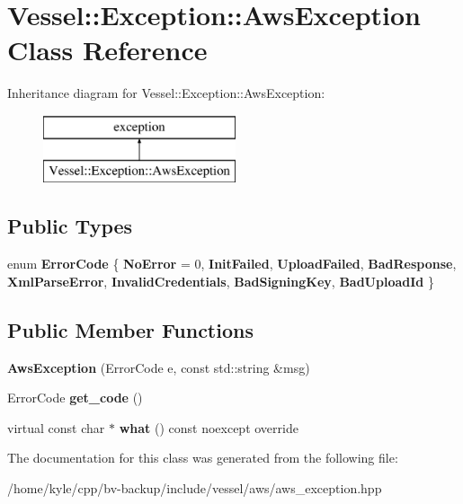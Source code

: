 \hypertarget{class_vessel_1_1_exception_1_1_aws_exception}{}\section{Vessel\+:\+:Exception\+:\+:Aws\+Exception Class Reference}
\label{class_vessel_1_1_exception_1_1_aws_exception}
Inheritance diagram for Vessel\+:\+:Exception\+:\+:Aws\+Exception\+:\begin{figure}[H]
\begin{center}
\leavevmode
\includegraphics[height=2.000000cm]{class_vessel_1_1_exception_1_1_aws_exception}
\end{center}
\end{figure}
\subsection*{Public Types}
\begin{DoxyCompactItemize}
\item 
\mbox{\label{class_vessel_1_1_exception_1_1_aws_exception_a37553d9ce96de364de06b14933d05a74}} 
enum {\bfseries Error\+Code} \{ \newline
{\bfseries No\+Error} = 0, 
{\bfseries Init\+Failed}, 
{\bfseries Upload\+Failed}, 
{\bfseries Bad\+Response}, 
\newline
{\bfseries Xml\+Parse\+Error}, 
{\bfseries Invalid\+Credentials}, 
{\bfseries Bad\+Signing\+Key}, 
{\bfseries Bad\+Upload\+Id}
 \}
\end{DoxyCompactItemize}
\subsection*{Public Member Functions}
\begin{DoxyCompactItemize}
\item 
\mbox{\label{class_vessel_1_1_exception_1_1_aws_exception_a94f2924ba17eaac83338a0ffa5ae77d4}} 
{\bfseries Aws\+Exception} (Error\+Code e, const std\+::string \&msg)
\item 
\mbox{\label{class_vessel_1_1_exception_1_1_aws_exception_abe49e7827f65f817810f81d7179c6e56}} 
Error\+Code {\bfseries get\+\_\+code} ()
\item 
\mbox{\label{class_vessel_1_1_exception_1_1_aws_exception_a75571f88039a35f1b629247c88c0de1a}} 
virtual const char $\ast$ {\bfseries what} () const noexcept override
\end{DoxyCompactItemize}


The documentation for this class was generated from the following file\+:\begin{DoxyCompactItemize}
\item 
/home/kyle/cpp/bv-\/backup/include/vessel/aws/aws\+\_\+exception.\+hpp\end{DoxyCompactItemize}
